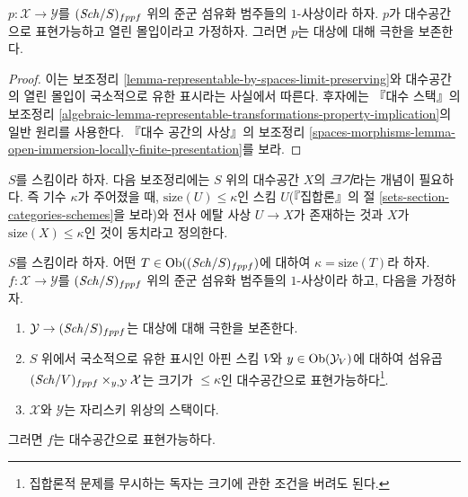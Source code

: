 \begin{lemma}
\label{lemma-open-immersion-limit-preserving}
$p : \mathcal{X} \to \mathcal{Y}$를 $(\mathit{Sch}/S)_{fppf}$ 위의
준군 섬유화 범주들의 $1$-사상이라 하자. $p$가 대수공간으로
표현가능하고 열린 몰입이라고 가정하자. 그러면 $p$는
대상에 대해 극한을 보존한다.
\end{lemma}

\begin{proof}
이는 보조정리 \ref{lemma-representable-by-spaces-limit-preserving}와
대수공간의 열린 몰입이 국소적으로 유한 표시라는 사실에서 따른다.
후자에는 『대수 스택』의 보조정리
\ref{algebraic-lemma-representable-transformations-property-implication}의
일반 원리를 사용한다. 『대수 공간의 사상』의 보조정리
\ref{spaces-morphisms-lemma-open-immersion-locally-finite-presentation}를 보라.
\end{proof}

\noindent
$S$를 스킴이라 하자. 다음 보조정리에는 $S$ 위의 대수공간 $X$의
{\it 크기}라는 개념이 필요하다. 즉 기수 $\kappa$가 주어졌을 때,
$\text{size}(U) \leq \kappa$인 스킴 $U$(『집합론』의 절
\ref{sets-section-categories-schemes}을 보라)와 전사 에탈 사상
$U \to X$가 존재하는 것과
$X$가 $\text{size}(X) \leq \kappa$인 것이 동치라고 정의한다.

\begin{lemma}
\label{lemma-check-representable-limit-preserving}
$S$를 스킴이라 하자.
어떤 $T \in \mathop{\mathrm{Ob}}\nolimits((\mathit{Sch}/S)_{fppf})$에 대하여
$\kappa = \text{size}(T)$라 하자.
$f : \mathcal{X} \to \mathcal{Y}$를 $(\mathit{Sch}/S)_{fppf}$ 위의
준군 섬유화 범주들의 $1$-사상이라 하고, 다음을 가정하자.
\begin{enumerate}
\item $\mathcal{Y} \to (\mathit{Sch}/S)_{fppf}$는 대상에 대해 극한을 보존한다.
\item $S$ 위에서 국소적으로 유한 표시인 아핀 스킴 $V$와
$y \in \mathop{\mathrm{Ob}}\nolimits(\mathcal{Y}_V)$에 대하여 섬유곱
$(\mathit{Sch}/V)_{fppf} \times_{y, \mathcal{Y}} \mathcal{X}$는
크기가 $\leq \kappa$인 대수공간으로 표현가능하다\footnote{
집합론적 문제를 무시하는 독자는 크기에 관한 조건을 버려도 된다.}.
\item $\mathcal{X}$와 $\mathcal{Y}$는 자리스키 위상의 스택이다.
\end{enumerate}
그러면 $f$는 대수공간으로 표현가능하다.
\end{lemma}


